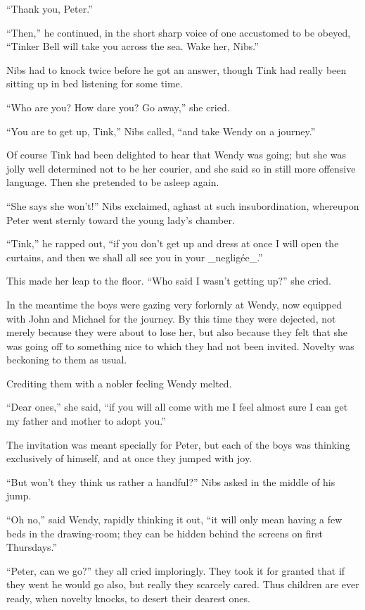 ``Thank you, Peter.''

``Then,'' he continued, in the short sharp voice of one accustomed to be
obeyed, ``Tinker Bell will take you across the sea. Wake her, Nibs.''

Nibs had to knock twice before he got an answer, though Tink had really
been sitting up in bed listening for some time.

``Who are you? How dare you? Go away,'' she cried.

``You are to get up, Tink,'' Nibs called, ``and take Wendy on a journey.''

Of course Tink had been delighted to hear that Wendy was going; but she
was jolly well determined not to be her courier, and she said so in
still more offensive language. Then she pretended to be asleep again.

``She says she won't!'' Nibs exclaimed, aghast at such insubordination,
whereupon Peter went sternly toward the young lady's chamber.

``Tink,'' he rapped out, ``if you don't get up and dress at once I will
open the curtains, and then we shall all see you in your _negligée_.''

This made her leap to the floor. ``Who said I wasn't getting up?'' she
cried.

In the meantime the boys were gazing very forlornly at Wendy, now
equipped with John and Michael for the journey. By this time they were
dejected, not merely because they were about to lose her, but also
because they felt that she was going off to something nice to which
they had not been invited. Novelty was beckoning to them as usual.

Crediting them with a nobler feeling Wendy melted.

``Dear ones,'' she said, ``if you will all come with me I feel almost sure
I can get my father and mother to adopt you.''

The invitation was meant specially for Peter, but each of the boys was
thinking exclusively of himself, and at once they jumped with joy.

``But won't they think us rather a handful?'' Nibs asked in the middle of
his jump.

``Oh no,'' said Wendy, rapidly thinking it out, ``it will only mean having
a few beds in the drawing-room; they can be hidden behind the screens
on first Thursdays.''

``Peter, can we go?'' they all cried imploringly. They took it for
granted that if they went he would go also, but really they scarcely
cared. Thus children are ever ready, when novelty knocks, to desert
their dearest ones.

